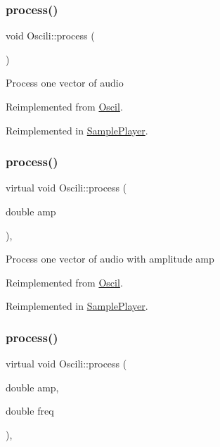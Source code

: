 \subsubsection{\texorpdfstring{process()}{process()}\hspace{0.1cm}{\footnotesize\ttfamily [1/3]}}
{\footnotesize\ttfamily void Oscili\+::process (\begin{DoxyParamCaption}{ }\end{DoxyParamCaption})\hspace{0.3cm}{\ttfamily [virtual]}}

Process one vector of audio 

Reimplemented from \hyperlink{class_oscil_a0e658a6f1b494286a783ce63e95f48ba}{Oscil}.



Reimplemented in \hyperlink{class_sample_player_a263ee55c5d334486bc57956458a64713}{Sample\+Player}.

\mbox{\label{class_oscili_a1fb47dff09f771481e1a1d2fde39d775}} 
\subsubsection{\texorpdfstring{process()}{process()}\hspace{0.1cm}{\footnotesize\ttfamily [2/3]}}
{\footnotesize\ttfamily virtual void Oscili\+::process (\begin{DoxyParamCaption}\item[{double}]{amp }\end{DoxyParamCaption})\hspace{0.3cm}{\ttfamily [inline]}, {\ttfamily [virtual]}}

Process one vector of audio with amplitude amp 

Reimplemented from \hyperlink{class_oscil_a7ed04cfd228e849ddf95d09ea0aee8c2}{Oscil}.



Reimplemented in \hyperlink{class_sample_player_a806595c5e7674717d52bb8a57f451c0b}{Sample\+Player}.

\mbox{\label{class_oscili_a053ace3b633b645c4b8a517009ea7389}} 
\subsubsection{\texorpdfstring{process()}{process()}\hspace{0.1cm}{\footnotesize\ttfamily [3/3]}}
{\footnotesize\ttfamily virtual void Oscili\+::process (\begin{DoxyParamCaption}\item[{double}]{amp,  }\item[{double}]{freq }\end{DoxyParamCaption})\hspace{0.3cm}{\ttfamily [inline]}, {\ttfamily [virtual]}}

